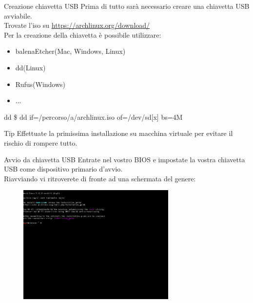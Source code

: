 \begin{frame}{Creazione chiavetta USB}
    Prima di tutto sarà necessario creare una chiavetta USB avviabile.\\Trovate l'iso su \url{https://archlinux.org/download/}\\
    Per la creazione della chiavetta è possibile utilizzare:
    \begin{itemize}
        \item balenaEtcher(Mac, Windows, Linux)
        \item dd(Linux)
        \item Rufus(Windows)
        \item ...
    \end{itemize}

    \begin{block}{dd}
        \$ dd if=/percorso/a/archlinux.iso of=/dev/sd[x] bs=4M\\
    \end{block}
    \begin{alertblock}{Tip}
        Effettuate la primissima installazione su macchina virtuale per evitare il rischio di rompere tutto.
    \end{alertblock}
\end{frame}

\begin{frame}{Avvio da chiavetta USB}
    Entrate nel vostro BIOS e impostate la vostra chiavetta USB come dispositivo primario d'avvio.\\
    Riavviando vi ritroverete di fronte ad una schermata del genere:
    \begin{figure}[h]
        \includegraphics[width=0.7\textwidth]{images/arch1.png}
    \end{figure}
\end{frame}

